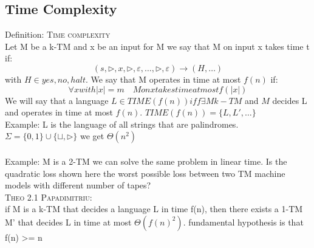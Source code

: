 \subsection*{Time Complexity}
Definition: \textsc{Time complexity}\\
Let M be a k-TM and x be an input for M we say that M on input x takes time t if: \[ 
    (s, \triangleright, x, \triangleright, \varepsilon, \ldots, \triangleright, \varepsilon) \longrightarrow ( H,\ldots) 
\] with $ H \in {yes, no, halt} $. We say that M operates in time at most $ f(n) $ if: \[ 
    \forall x with |x| = m \quad M on x takes time at most f(|x|) 
\]
We will say that a language $ L \in TIME(f(n)) iff \exists M k-TM$ and $M$ decides L and operates in time at most $f(n)$. $TIME(f(n)) = \{L, L', \ldots\} $\\
Example: L is the language of all strings that are palindromes. $ \Sigma = \{0,1\}\cup\{\sqcup, \triangleright\} $ we get $ \Theta(n^2) $\\\\
Example: M is a 2-TM we can solve the same problem in linear time. Is the quadratic loss shown here the worst possible loss between two TM machine models with different number of tapes?\\
\textsc{Theo 2.1 Papadimitriu}:\\
if M is a k-TM that decides a language L in time f(n), then there exists a 1-TM M' that decides L in time at most $ \Theta(f(n)^2) $. fundamental hypothesis is that f(n) >= n
